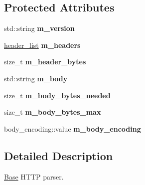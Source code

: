 \subsection*{Protected Attributes}
\begin{DoxyCompactItemize}
\item 
\mbox{\label{classwebsocketpp_1_1http_1_1parser_1_1parser_a3e8026fc40c96ca8bfa46a533e00d6a6}} 
std\+::string {\bfseries m\+\_\+version}
\item 
\mbox{\label{classwebsocketpp_1_1http_1_1parser_1_1parser_ae75e1e6acd17cc5a5543f818a5355a50}} 
\mbox{\hyperlink{classstd_1_1map}{header\+\_\+list}} {\bfseries m\+\_\+headers}
\item 
\mbox{\label{classwebsocketpp_1_1http_1_1parser_1_1parser_ae82ee117b729da521de60401cd17f8d4}} 
size\+\_\+t {\bfseries m\+\_\+header\+\_\+bytes}
\item 
\mbox{\label{classwebsocketpp_1_1http_1_1parser_1_1parser_a2a552a4581ae26674fd6d566e5b332ee}} 
std\+::string {\bfseries m\+\_\+body}
\item 
\mbox{\label{classwebsocketpp_1_1http_1_1parser_1_1parser_a89e6a7583bee97f30c60dc88b4cd29dd}} 
size\+\_\+t {\bfseries m\+\_\+body\+\_\+bytes\+\_\+needed}
\item 
\mbox{\label{classwebsocketpp_1_1http_1_1parser_1_1parser_a85613c9d20e308ff343449852b7e769f}} 
size\+\_\+t {\bfseries m\+\_\+body\+\_\+bytes\+\_\+max}
\item 
\mbox{\label{classwebsocketpp_1_1http_1_1parser_1_1parser_a286e19d30028f6dbc295ad578e8e50d3}} 
body\+\_\+encoding\+::value {\bfseries m\+\_\+body\+\_\+encoding}
\end{DoxyCompactItemize}


\subsection{Detailed Description}
\mbox{\hyperlink{struct_base}{Base}} H\+T\+TP parser. 

